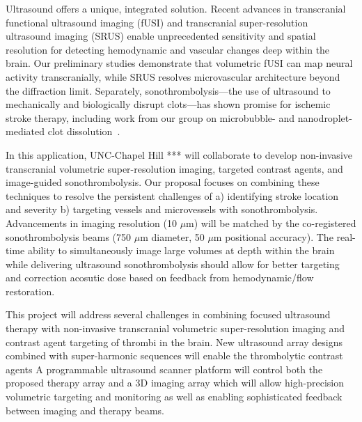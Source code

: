 \documentclass[fleqn,11pt,letterpaper]{article}
\begin{document}
Ultrasound offers a unique, integrated solution. Recent advances in transcranial functional ultrasound imaging (fUSI) and transcranial super-resolution ultrasound imaging (SRUS) enable unprecedented sensitivity and spatial resolution for detecting hemodynamic and vascular changes deep within the brain. Our preliminary studies demonstrate that volumetric fUSI can map neural activity transcranially, while SRUS resolves microvascular architecture beyond the diffraction limit. Separately, sonothrombolysis—the use of ultrasound to mechanically and biologically disrupt clots—has shown promise for ischemic stroke therapy, including work from our group on microbubble- and nanodroplet-mediated clot dissolution~\cite{kim2022analysis,kim2020comparison,wu2021dual,bautista2023current}. 






In this application, UNC-Chapel Hill *** will collaborate to develop non-invasive transcranial volumetric super-resolution imaging, targeted contrast agents, and image-guided sonothrombolysis.  Our proposal focuses on combining these techniques to resolve the persistent challenges of a) identifying stroke location and severity b) targeting vessels and microvessels with sonothrombolysis. Advancements in imaging resolution (10 $\mu$m) will be matched by the co-registered sonothrombolysis beams (750 $\mu$m diameter, 50 $\mu$m positional accuracy).  The real-time ability to simultaneously image large volumes at depth within the brain while delivering ultrasound sonothrombolysis should allow for better targeting and correction acosutic dose based on feedback from hemodynamic/flow restoration.

This project will address several challenges in combining focused ultrasound therapy with non-invasive transcranial volumetric super-resolution imaging and contrast agent targeting of thrombi in the brain.  New ultrasound array designs combined with super-harmonic sequences will enable the thrombolytic contrast agents  A programmable ultrasound scanner platform will control both the proposed therapy array and a 3D imaging array which will allow high-precision volumetric targeting and monitoring as well as enabling sophisticated feedback between imaging and therapy beams. 
\end{document}
